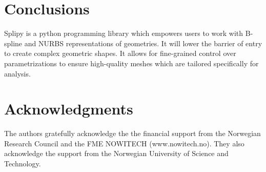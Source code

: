 \documentclass[preprint,12pt, a4paper]{elsarticle}
\begin{document}

\section{Conclusions}
\label{sec:conclusion}

Splipy is a python programming library which empowers users to work with B-spline and NURBS representations of geometries.
It will lower the barrier of entry to create complex geometric shapes.
It allows for fine-grained control over parametrizations to ensure high-quality meshes which are tailored specifically for analysis.

\section*{Acknowledgments}
\label{}

The authors gratefully acknowledge the the financial support from the Norwegian Research Council and the FME NOWITECH (www.nowitech.no). They also acknowledge the support from the Norwegian University of Science and Technology.



{}

\end{document}
